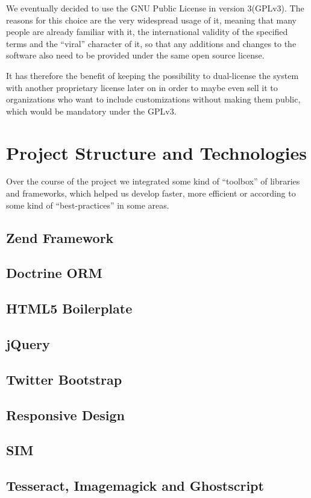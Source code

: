 We eventually decided to use the GNU Public License in version 3(GPLv3). The reasons for this choice are the very widespread usage of it, meaning that many people are already 
familiar with it, the international validity of the specified terms and the \enquote{viral}
character of it, so that any additions and changes to the software also need to be provided 
under the same open source license.

It has therefore the benefit of keeping the possibility to dual-license the system with another proprietary license later on in order to maybe even sell it to organizations who want to include
customizations without making them public, which would be mandatory under the GPLv3.

\section{Project Structure and Technologies}

Over the course of the project we integrated some kind of \enquote{toolbox} of libraries and frameworks, which 
helped us develop faster, more efficient or according to some kind of \enquote{best-practices}
in some areas. 

\subsection{Zend Framework}

\subsection{Doctrine ORM}

\subsection{HTML5 Boilerplate}

\subsection{jQuery}

\subsection{Twitter Bootstrap}

\subsection{Responsive Design}

\subsection{SIM}

\subsection{Tesseract, Imagemagick and Ghostscript}


